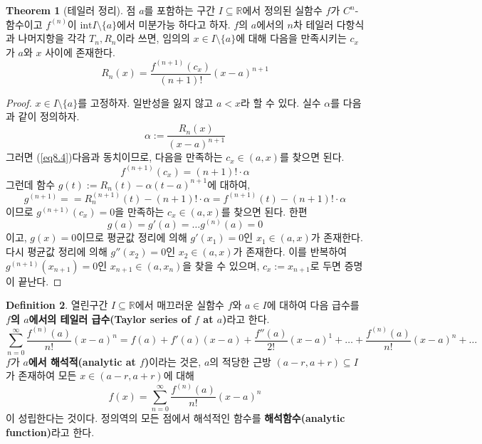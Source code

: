 \documentclass[11pt]{book}
\numberwithin{equation}{chapter}
\def\RR{\mathbb{R}}
\def\Int{\text{int}}
\theoremstyle{definition}
\newtheorem{thm}{Theorem}[section]
\newtheorem{defn}[thm]{Definition}
\begin{document}
\begin{thm}[테일러 정리]
    점 \(a\)를 포함하는 구간 \(I \subseteq \RR\)에서 정의된 실함수 \(f\)가 \(C^n\)-함수이고 \(f^{(n)}\)이 \(\Int I \setminus \{a\}\)에서 미분가능 하다고 하자. \(f\)의 \(a\)에서의 \(n\)차 테일러 다항식과 나머지항을 각각 \(T_n, R_n\)이라 쓰면, 임의의 \(x \in I \setminus \{a\}\)에 대해 다음을 만족시키는 \(c_x\)가 \(a\)와 \(x\) 사이에 존재한다.
    \begin{equation} \label{eq8.4}
        R_n(x) = \frac{f^{(n+1)}(c_x)}{(n+1)!} (x-a)^{n+1}
    \end{equation}
\end{thm}
\begin{proof}
    \(x \in I \setminus \{a\}\)를 고정하자. 일반성을 잃지 않고 \(a < x\)라 할 수 있다. 실수 \(\alpha\)를 다음과 같이 정의하자.
    \[
    \alpha := \frac{R_n(x)}{(x-a)^{n+1}}    
    \]
    그러면 (\ref{eq8.4})\는 다음과 동치이므로, 다음을 만족하는 \(c_x \in (a, x)\)를 찾으면 된다.
    \begin{equation} \label{eq8.5}
        f^{(n+1)}(c_x) = (n+1)! \cdot \alpha
    \end{equation}
    그런데 함수 \(g(t) := R_n(t) - \alpha(t-a)^{n+1}\)에 대하여,
    \[
        g^{(n+1)} = = R_n^{(n+1)}(t) - (n+1)! \cdot \alpha = f^{(n+1)}(t) - (n+1)! \cdot \alpha
    \]
    이므로 \(g^{(n+1)}(c_x) = 0\)을 만족하는 \(c_x \in (a, x)\)를 찾으면 된다. 한편
    \[
      g(a) = g'(a) = \ldots g^{(n)}(a) = 0
    \]
    이고, \(g(x) = 0\)이므로 평균값 정리에 의해 \(g'(x_1) = 0\)인 \(x_1 \in (a, x)\)가 존재한다. 다시 평균값 정리에 의해 \(g''(x_2) = 0\)인 \(x_2 \in (a, x)\)가 존재한다. 이를 반복하여 \(g^{(n+1)}(x_{n+1}) = 0\)인 \(x_{n+1} \in (a, x_n)\)을 찾을 수 있으며, \(c_x := x_{n+1}\)로 두면 증명이 끝난다.
\end{proof}

\begin{defn}
    열린구간 \(I \subseteq \RR\)에서 매끄러운 실함수 \(f\)와 \(a \in I\)에 대하여 다음 급수를 \textbf{\(f\)의 \(a\)에서의 테일러 급수(Taylor series of \(f\) at \(a\))}라고 한다.
    \[
    \sum_{n=0}^\infty \frac{f^{(n)}(a)}{n!} (x-a)^n = f(a) + f'(a)(x-a) + \frac{f''(a)}{2!}(x-a)^1 + \ldots + \frac{f^{(n)}(a)}{n!} (x-a)^n + \ldots
    \]
    \(f\)가 \textbf{\(a\)에서 해석적(analytic at \(f\))}이라는 것은, \(a\)의 적당한 근방 \((a - r, a + r) \subseteq I\)가 존재하여 모든 \(x \in (a-r, a+r)\)에 대해
    \[
    f(x) =     \sum_{n=0}^\infty \frac{f^{(n)}(a)}{n!} (x-a)^n
    \]
    이 성립한다는 것이다. 정의역의 모든 점에서 해석적인 함수를 \textbf{해석함수(analytic function)}라고 한다.
\end{defn}
\end{document}
